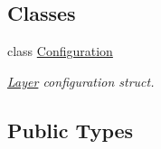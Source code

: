 \subsection*{Classes}
\begin{DoxyCompactItemize}
\item 
class \hyperlink{classffnn_1_1layer_1_1_convolution_1_1_configuration}{Configuration}
\begin{DoxyCompactList}\small\item\em \hyperlink{classffnn_1_1layer_1_1_layer}{Layer} configuration struct. \end{DoxyCompactList}\end{DoxyCompactItemize}
\subsection*{Public Types}
